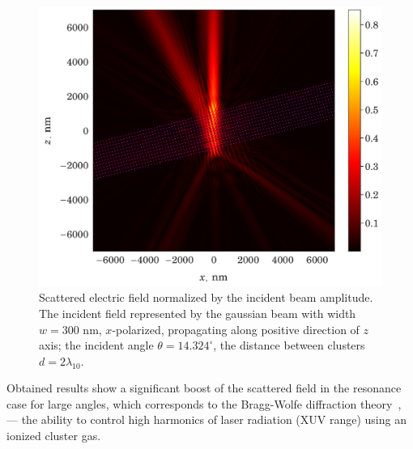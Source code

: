 \documentclass[conference]{IEEEtran}
\begin{document}

\begin{figure}[htbp]
	\centerline{\includegraphics[width=0.84\columnwidth]{../components/img/celes/TE_14.324deg_check.pdf}}
	\caption{Scattered electric field normalized by the incident beam amplitude. The incident field represented by the gaussian beam with width $w = 300$ nm, $x$-polarized, propagating along positive direction of $z$ axis; the incident angle $\theta = 14.324^{\circ}$, the distance between clusters $d = 2\lambda_{10}$.}
	\label{14.324deg:image}
\end{figure}


Obtained results show a significant boost of the scattered field in the resonance case for large angles, which corresponds to the Bragg-Wolfe diffraction theory~\cite{boren_huffman}, --- the ability to control high harmonics of laser radiation (XUV range) using an ionized cluster gas.



\end{document}
